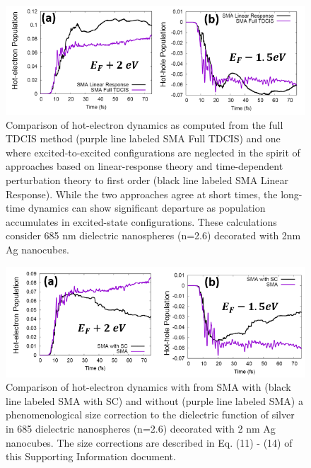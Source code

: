 \documentclass[journal=jpclcd,manuscript=suppinfo]{achemso}
\begin{document}
\begin{figure}
\begin{center}
\includegraphics[width=6in]{Ag_LR_vs_TDCIS.png}
\caption{Comparison of hot-electron dynamics as computed from the full TDCIS method (purple
line labeled SMA Full TDCIS) and one where
excited-to-excited configurations are neglected in the spirit of approaches based on linear-response
theory and time-dependent perturbation theory to first order (black line labeled SMA Linear Response).  While the two approaches agree at short
times, the long-time dynamics can show significant departure as population accumulates
in excited-state configurations.  These calculations consider 685 nm dielectric nanospheres (n=2.6)
decorated with 2nm Ag nanocubes. }
\end{center}
\end{figure}


\begin{figure}
\begin{center}
\includegraphics[width=6in]{Ag_SC_Compare.png}
\caption{Comparison of hot-electron dynamics with from SMA with (black line labeled SMA with SC) and without
(purple line labeled SMA) a phenomenological size
correction to the dielectric function of silver in 685 dielectric nanospheres (n=2.6) decorated with 2 nm Ag nanocubes.
The size corrections are described in Eq. (11) - (14) of this Supporting Information document.  }
\end{center}
\end{figure}
\end{document}
